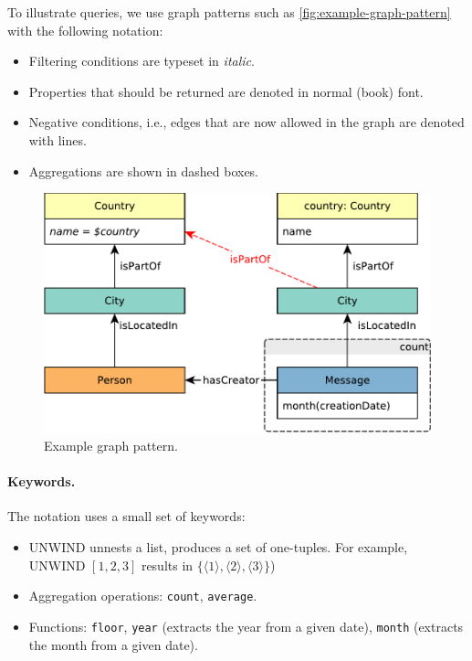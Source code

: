 To illustrate queries, we use graph patterns such as \autoref{fig:example-graph-pattern} with the following notation:

\begin{itemize}
	\item Filtering conditions are typeset in \textit{italic}.
	\item Properties that should be returned are denoted in normal (book) font.
	\item Negative conditions, i.e., edges that are now allowed in the graph are denoted with \textcolor{red}{} lines.
	\item Aggregations are shown in dashed boxes.
\end{itemize}

\begin{figure}[ht]
	\begin{center}
		\includegraphics[scale=\patternscale,margin=0cm .2cm]{patterns/bi-read-23}
		\caption{Example graph pattern.}
		\label{fig:example-graph-pattern}
	\end{center}
\end{figure}

\newcommand{\tuple}[1]{\langle #1 \rangle}

\paragraph{Keywords.} The notation uses a small set of keywords:

\begin{itemize}
	\item \textsf{UNWIND} unnests a list, \ie produces a set of one-tuples. For example, UNWIND $ [1, 2, 3] $ results in $ \{ \tuple{1}, \tuple{2}, \tuple{3} \} $)
	\item Aggregation operations: \lstinline{count}, \lstinline{average}. %
	\item Functions: \lstinline{floor}, \lstinline{year} (extracts the year from a given date), \lstinline{month} (extracts the month from a given date).
\end{itemize}

